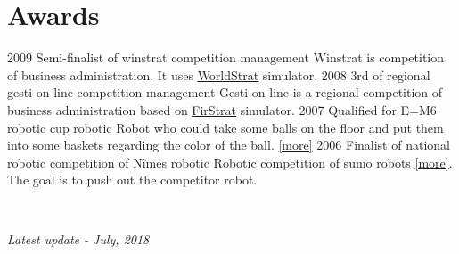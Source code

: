 \documentclass[]{friggeri-cv}
\begin{document}
\section{Awards}
\begin{entrylist}
    \entry
        {2009}
	{Semi-finalist of winstrat competition}
        {management}
	{Winstrat is competition of business administration. It uses \href{http://www.stratelogic.com/worldstrat/}{\underline{WorldStrat}} simulator.}
    \entry
        {2008}
	{3rd of regional gesti-on-line competition}
        {management}
	{Gesti-on-line is a regional competition of business administration based on \href{http://www.stratelogic.com/firstrat/}{\underline{FirStrat}} simulator.}
    \entry
        {2007}
	{Qualified for E=M6 robotic cup}
        {robotic}
	{Robot who could take some balls on the floor and put them into some baskets regarding the color of the ball. \href{https://www.coupederobotique.fr/}{[\underline{more}]}}
    \entry
        {2006}
	{Finalist of national robotic competition of Nîmes}
        {robotic}
	{Robotic competition of sumo robots \href{http://www.robot-sumo.fr/}{[\underline{more}]}. The goal is to push out the competitor robot. }
\end{entrylist}
~
\begin{flushright}
    \emph{Latest update - July, 2018}
\end{flushright}

\begin{aside}
~
~
~
\end{aside}
\end{document}
